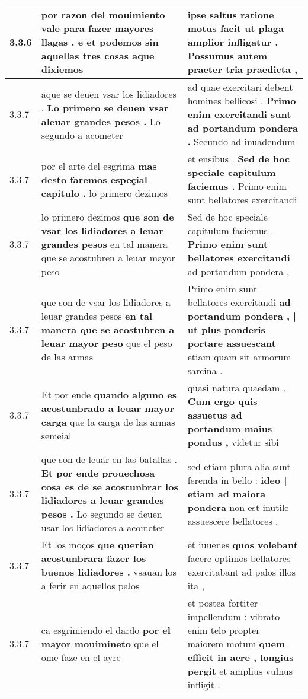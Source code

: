 \begin{tabular}{|p{1cm}|p{6.5cm}|p{6.5cm}|}
3.3.6 & por razon del mouimiento vale \textbf{ para fazer mayores llagas . } e et podemos sin aquellas tres cosas aque dixiemos & ipse saltus ratione motus facit \textbf{ ut plaga amplior infligatur . } Possumus autem praeter tria praedicta , \\\hline
3.3.7 & aque se deuen vsar los lidiadores . \textbf{ Lo primero se deuen vsar aleuar grandes pesos . } Lo segundo a acometer & ad quae exercitari debent homines bellicosi . \textbf{ Primo enim exercitandi sunt ad portandum pondera . } Secundo ad inuadendum \\\hline
3.3.7 & por el arte del esgrima \textbf{ mas desto faremos espeçial capitulo . } lo primero dezimos & et ensibus . \textbf{ Sed de hoc speciale capitulum faciemus . } Primo enim sunt bellatores exercitandi \\\hline
3.3.7 & lo primero dezimos \textbf{ que son de vsar los lidiadores a leuar grandes pesos } en tal manera que se acostubren a leuar mayor peso & Sed de hoc speciale capitulum faciemus . \textbf{ Primo enim sunt bellatores exercitandi } ad portandum pondera , \\\hline
3.3.7 & que son de vsar los lidiadores a leuar grandes pesos \textbf{ en tal manera que se acostubren a leuar mayor peso } que el peso de las armas & Primo enim sunt bellatores exercitandi \textbf{ ad portandum pondera , | ut plus ponderis portare assuescant } etiam quam sit armorum sarcina . \\\hline
3.3.7 & Et por ende \textbf{ quando alguno es acostunbrado a leuar mayor carga } que la carga de las armas semeial & quasi natura quaedam . \textbf{ Cum ergo quis assuetus ad portandum maius pondus , } videtur sibi \\\hline
3.3.7 & que son de leuar en las batallas . \textbf{ Et por ende prouechosa cosa es de se acostunbrar los lidiadores a leuar grandes pesos . } Lo segundo se deuen usar los lidiadores a acometer & sed etiam plura alia sunt ferenda in bello : \textbf{ ideo | etiam ad maiora pondera } non est inutile assuescere bellatores . \\\hline
3.3.7 & Et los moços \textbf{ que querian acostunbrara fazer los buenos lidiadores . } vsauan los a ferir en aquellos palos & et iuuenes \textbf{ quos volebant } facere optimos bellatores exercitabant ad palos illos ita , \\\hline
3.3.7 & ca esgrimiendo el dardo \textbf{ por el mayor mouimineto } que el ome faze en el ayre & et postea fortiter impellendum : vibrato enim telo propter maiorem motum \textbf{ quem efficit in aere , longius pergit } et amplius vulnus infligit . \\\hline

\end{tabular}
